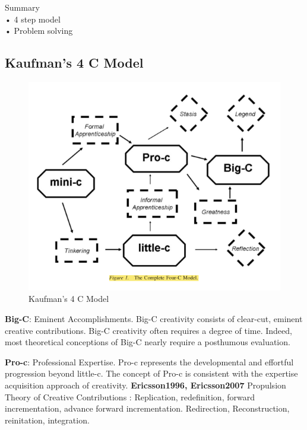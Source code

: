 \begin{shaded}
  Summary\\
  •	4 step model\\
  •	Problem solving
\end{shaded}

\subsection{Kaufman's 4 C Model}

\begin{figure}[htb!] %
  \centering
  \includegraphics[width=\linewidth]{images/4C.png}
\caption[Kaufman's 4 C Model]{Kaufman's 4 C Model}
\label{fig:4C}
\end{figure}

\citep{Kaufman2009}

\textbf{Big-C}: Eminent Accomplishments. Big-C creativity consists of clear-cut, eminent creative contributions. Big-C creativity often requires a degree of time. Indeed, most theoretical conceptions of Big-C nearly require a posthumous evaluation.

\textbf{Pro-c}: Professional Expertise. Pro-c represents the developmental and effortful progression beyond little-c. The concept of Pro-c is consistent with the expertise acquisition approach of creativity. \textbf{Ericsson1996, Ericsson2007} Propulsion Theory of Creative Contributions \citep{Sternberg1999,Sternberg2006}: Replication, redefinition, forward incrementation, advance forward incrementation. Redirection, Reconstruction, reinitation, integration.

